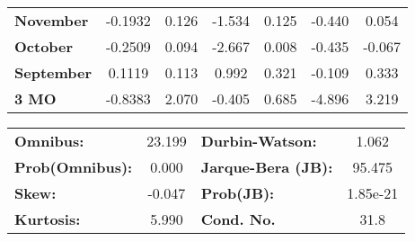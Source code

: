 \begin{center}
\begin{tabular}{lcccccc}
\textbf{November}  &      -0.1932  &        0.126     &    -1.534  &         0.125        &       -0.440    &        0.054     \\
\textbf{October}   &      -0.2509  &        0.094     &    -2.667  &         0.008        &       -0.435    &       -0.067     \\
\textbf{September} &       0.1119  &        0.113     &     0.992  &         0.321        &       -0.109    &        0.333     \\
\textbf{3 MO}      &      -0.8383  &        2.070     &    -0.405  &         0.685        &       -4.896    &        3.219     \\
\bottomrule
\end{tabular}
\begin{tabular}{lclc}
\textbf{Omnibus:}       & 23.199 & \textbf{  Durbin-Watson:     } &    1.062  \\
\textbf{Prob(Omnibus):} &  0.000 & \textbf{  Jarque-Bera (JB):  } &   95.475  \\
\textbf{Skew:}          & -0.047 & \textbf{  Prob(JB):          } & 1.85e-21  \\
\textbf{Kurtosis:}      &  5.990 & \textbf{  Cond. No.          } &     31.8  \\
\bottomrule
\end{tabular}
\end{center}

